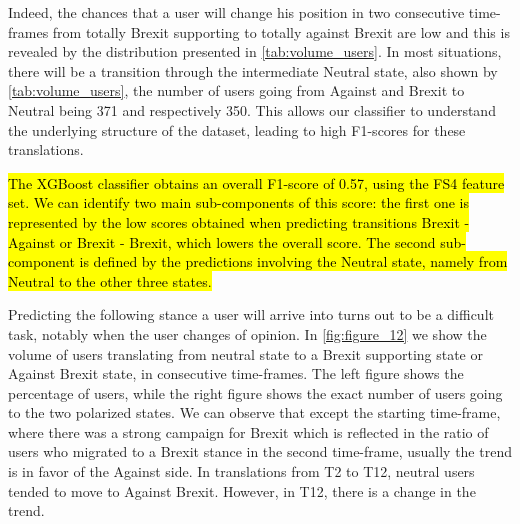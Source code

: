 Indeed, the chances that a user will change his position in two consecutive time-frames from totally Brexit supporting to totally against Brexit are low and this is revealed by the distribution presented in \cref{tab:volume_users}.  In most situations, there will be a transition through the intermediate Neutral state, also shown by \cref{tab:volume_users}, the number of users going from Against and Brexit to Neutral being 371 and respectively 350. This allows our classifier to understand the underlying structure of the dataset, leading to high F1-scores for these translations.

\hl{The XGBoost classifier obtains an overall F1-score of 0.57, using the FS4 feature set. We can identify two main sub-components of this score: the first one is represented by the low scores obtained when predicting transitions Brexit - Against or Brexit - Brexit, which lowers the overall score. The second sub-component is defined by the predictions involving the Neutral state, namely from Neutral to the other three states.}

Predicting the following stance a user will arrive into turns out to be a difficult task, notably when the user changes of opinion. 
In \cref{fig:figure_12} we show the volume of users translating from neutral state to a Brexit supporting state or Against Brexit state, in consecutive time-frames. The left figure shows the percentage of users, while the right figure shows the exact number of users going to the two polarized states. We can observe that except the starting time-frame, where there was a strong campaign for Brexit which is reflected in the ratio of users who migrated to a Brexit stance in the second time-frame, usually the trend is in favor of the Against side. In translations from T2 to T12, neutral users tended to move to Against Brexit. However, in T12, there is a change in the trend. 

\begin{figure*}[tbp]
	\centering
	\newcommand\myheightA{0.175} %
	\caption{ 
		a) Ratio of users transitioning to the other stances in consecutive time-frames.  ratio. 
		b) Number of users transitioning to the other stances in consecutive time-frames. 
	}
	\label{fig:figure_12}
\end{figure*}


